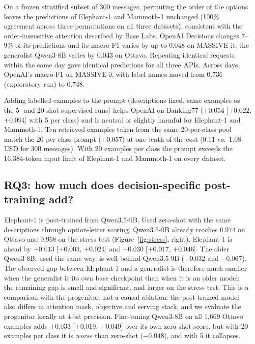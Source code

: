 On a frozen stratified subset of 300 messages, permuting the order of the options leaves the predictions of Elephant-1 and Mammoth-1
unchanged (100\% agreement across three permutations on all three datasets), consistent with the order-insensitive attention described by
Base Labs. OpenAI Decisions changes 7--9\% of its predictions and its macro-F1 varies by up to 0.048 on MASSIVE-it; the generalist
Qwen3-8B varies by 0.043 on Ottavo. Repeating identical requests within the same day gave identical predictions for all three APIs.
Across days, OpenAI's macro-F1 on MASSIVE-it with label names moved from 0.736 (exploratory run) to 0.748.

Adding labelled examples to the prompt (descriptions fixed, same examples as the 5- and 20-shot supervised runs) helps OpenAI on Banking77
($+0.054$ [$+0.022$, $+0.094$] with 5 per class) and is neutral or slightly harmful for Elephant-1 and Mammoth-1. Ten retrieved examples
taken from the same 20-per-class pool match the 20-per-class prompt ($+0.057$) at one tenth of the cost (0.11 vs.\ 1.08 USD for 300 messages).
With 20 examples per class the prompt exceeds the 16{,}384-token input limit of Elephant-1 and Mammoth-1 on every dataset.

\subsection{RQ3: how much does decision-specific post-training add?}

Elephant-1 is post-trained from Qwen3.5-9B. Used zero-shot with the same descriptions through option-letter scoring, Qwen3.5-9B already
reaches 0.974 on Ottavo and 0.968 on the stress test (Figure~\ref{fig:stress}, right). Elephant-1 is ahead by $+0.013$ [$+0.003$, $+0.024$]
and $+0.030$ [$+0.017$, $+0.046$]. The older Qwen3-8B, used the same way, is well behind Qwen3.5-9B ($-0.032$ and $-0.067$). The
observed gap between Elephant-1 and a generalist is therefore much smaller when the generalist is its own base checkpoint than when it is
an older model; the remaining gap is small and significant, and larger on the stress test. This is a comparison with the progenitor, not a causal ablation: the post-trained model
also differs in attention mask, objective and serving stack, and we evaluate the progenitor locally at 4-bit precision.
Fine-tuning Qwen3-8B on all 1{,}669 Ottavo examples adds $+0.033$ [$+0.019$, $+0.049$] over its own zero-shot score, but with 20 examples
per class it is \emph{worse} than zero-shot ($-0.048$), and with 5 it collapses.

